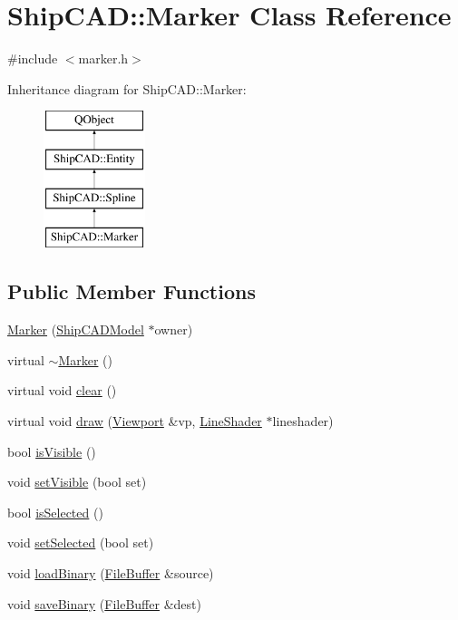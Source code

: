 \hypertarget{classShipCAD_1_1Marker}{\section{Ship\-C\-A\-D\-:\-:Marker Class Reference}
\label{classShipCAD_1_1Marker}
}


{\ttfamily \#include $<$marker.\-h$>$}

Inheritance diagram for Ship\-C\-A\-D\-:\-:Marker\-:\begin{figure}[H]
\begin{center}
\leavevmode
\includegraphics[height=4.000000cm]{classShipCAD_1_1Marker}
\end{center}
\end{figure}
\subsection*{Public Member Functions}
\begin{DoxyCompactItemize}
\item 
\hyperlink{classShipCAD_1_1Marker_a216cf592a0945f6b6923a00c9625e3bf}{Marker} (\hyperlink{classShipCAD_1_1ShipCADModel}{Ship\-C\-A\-D\-Model} $\ast$owner)
\item 
virtual \hyperlink{classShipCAD_1_1Marker_aed0a670782857dee1824a6eb9c2e1498}{$\sim$\-Marker} ()
\item 
virtual void \hyperlink{classShipCAD_1_1Marker_ac7c7eea8648562f3fa00a9e10af6ec97}{clear} ()
\item 
virtual void \hyperlink{classShipCAD_1_1Marker_a0cca647d9b32dc69b03903b024dc3091}{draw} (\hyperlink{classShipCAD_1_1Viewport}{Viewport} \&vp, \hyperlink{classShipCAD_1_1LineShader}{Line\-Shader} $\ast$lineshader)
\item 
bool \hyperlink{classShipCAD_1_1Marker_a693fef3930809d5c4b2ce3755662e367}{is\-Visible} ()
\item 
void \hyperlink{classShipCAD_1_1Marker_af21b0bac028e01ce02ea97bf6f83cccc}{set\-Visible} (bool set)
\item 
bool \hyperlink{classShipCAD_1_1Marker_aac6bc8a781945739646cfc8dd6c5b99c}{is\-Selected} ()
\item 
void \hyperlink{classShipCAD_1_1Marker_ad3bbb4a01e11e3d2885f56599a77a3d1}{set\-Selected} (bool set)
\item 
void \hyperlink{classShipCAD_1_1Marker_a0f2aa7cd6bae40784c077b89d5ebdb50}{load\-Binary} (\hyperlink{classShipCAD_1_1FileBuffer}{File\-Buffer} \&source)
\item 
void \hyperlink{classShipCAD_1_1Marker_abceb4cbb5b038eb88d0f7f26507be15c}{save\-Binary} (\hyperlink{classShipCAD_1_1FileBuffer}{File\-Buffer} \&dest)
\end{DoxyCompactItemize}
